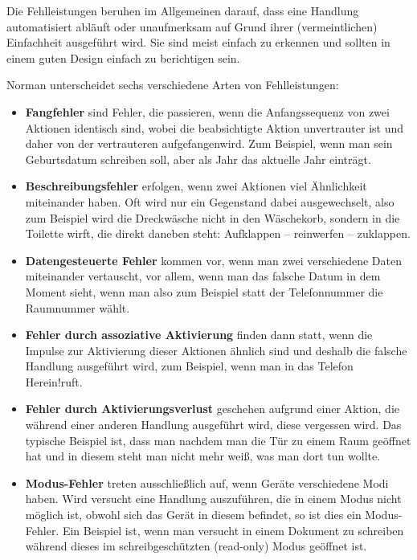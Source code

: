 \documentclass[parskip,headsepline, headtopline, %
footsepline, oneside, 12pt, headings=small]{scrreprt}
\begin{document}
Die Fehlleistungen beruhen im Allgemeinen darauf, dass eine Handlung automatisiert abläuft oder unaufmerksam auf Grund ihrer (vermeintlichen) Einfachheit ausgeführt wird. Sie sind meist einfach zu erkennen und sollten in einem guten Design einfach zu berichtigen sein.

Norman unterscheidet sechs verschiedene Arten von Fehlleistungen\cite[S. 107]{don}:

\begin{itemize}
\item \textbf{Fangfehler} sind Fehler, die passieren, wenn die Anfangssequenz von zwei Aktionen identisch sind, wobei die beabsichtigte Aktion unvertrauter ist und daher von der vertrauteren \glqq aufgefangen\grqq wird. Zum Beispiel, wenn man sein Geburtsdatum schreiben soll, aber als Jahr das aktuelle Jahr einträgt.
\item \textbf{Beschreibungsfehler} erfolgen, wenn zwei Aktionen viel Ähnlichkeit miteinander haben. Oft wird nur ein Gegenstand dabei ausgewechselt, also zum Beispiel wird die Dreckwäsche nicht in den Wäschekorb, sondern in die Toilette wirft, die direkt daneben steht: Aufklappen -- reinwerfen -- zuklappen.
\item \textbf{Datengesteuerte Fehler} kommen vor, wenn man zwei verschiedene Daten miteinander vertauscht, vor allem, wenn man das falsche Datum in dem Moment sieht, wenn man also zum Beispiel statt der Telefonnummer die Raumnummer wählt.
\item \textbf{Fehler durch assoziative Aktivierung} finden dann statt, wenn die Impulse zur Aktivierung dieser Aktionen ähnlich sind und deshalb die falsche Handlung ausgeführt wird, zum Beispiel, wenn man in das Telefon \glqq Herein!\grqq  ruft.
\item \textbf{Fehler durch Aktivierungsverlust} geschehen aufgrund einer Aktion, die während einer anderen Handlung ausgeführt wird, diese vergessen wird. Das typische Beispiel ist, dass man nachdem man die Tür zu einem Raum geöffnet hat und in diesem steht man nicht mehr weiß, was man dort tun wollte.
\item \textbf{Modus-Fehler} treten ausschließlich auf, wenn Geräte verschiedene Modi haben. Wird versucht eine Handlung auszuführen, die in einem Modus nicht möglich ist, obwohl sich das Gerät in diesem befindet, so ist dies ein Modus-Fehler. Ein Beispiel ist, wenn man versucht in einem Dokument zu schreiben während dieses im schreibgeschützten (read-only) Modus geöffnet ist.
\end{itemize}
\end{document}
